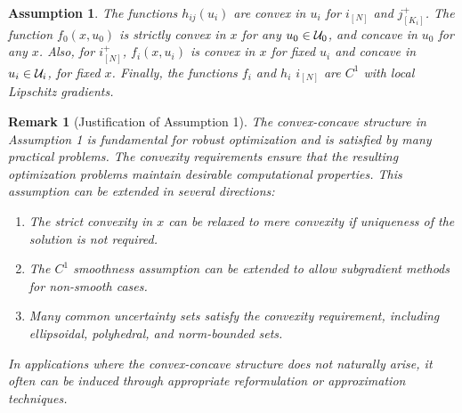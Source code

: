 \documentclass[journal,twoside,web]{ieeecolor}
\newtheorem{assumption}[theorem]{Assumption}
\newtheorem{remark}{Remark}
\begin{document}
\begin{assumption}\label{assume1} The functions $h_{ij}(u_i)$ are convex in $u_i$ for $i_{[N]}$ and $j^+_{[K_i]}$.
The function $f_0(x,u_0)$ is strictly convex in $x$ for any $u_0\in {\cal U}_0$, and concave in $u_0$ for any $x$. Also, for $i^+_{[N]}$, $f_i(x,u_i)$ is convex in $x$ for fixed $u_i$ and concave in $u_i\in {\cal U}_i$, for fixed $x$.
Finally, the functions $f_i$ and $h_i$ $i_{[N]}$ are $C^1$ with local Lipschitz gradients.
\end{assumption}

{\color{blue} \begin{remark}[Justification of Assumption 1]
The convex-concave structure in Assumption 1 is fundamental for robust optimization and is satisfied by many practical problems. The convexity requirements ensure that the resulting optimization problems maintain desirable computational properties. This assumption can be extended in several directions:
\begin{enumerate}
\item The strict convexity in $x$ can be relaxed to mere convexity if uniqueness of the solution is not required.
\item The $C^1$ smoothness assumption can be extended to allow subgradient methods for non-smooth cases.
\item Many common uncertainty sets satisfy the convexity requirement, including ellipsoidal, polyhedral, and norm-bounded sets.
\end{enumerate}
In applications where the convex-concave structure does not naturally arise, it often can be induced through appropriate reformulation or approximation techniques.
\end{remark}}
\end{document}

